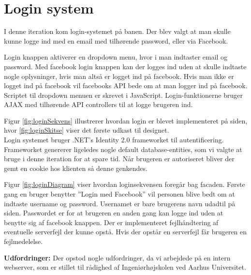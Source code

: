 \section{Login system}

I denne iteration kom login-systemet på banen. Der blev valgt at man skulle kunne logge ind med en email med tilhørende password, eller via Facebook.


Login knappen aktiverer en dropdown menu, hvor i man indtaster email og password. Med facebook login knappen kan der logges ind uden at skulle indtaste nogle oplysninger, hvis man altså er logget ind på facebook. Hvis man ikke er logget ind på facebook vil facebooks API bede om at man logger ind på facebook. Scriptet til dropdown menuen er skrevet i JavaScript. Login-funktionerne bruger AJAX med tilhørende API controllers til at logge brugeren ind.


Figur \ref{fig:loginSekvens} illustrerer hvordan login er blevet implementeret på siden, hvor \ref{fig:loginSkitse} viser det første udkast til designet. \\

Login systemet bruger .NET's Identity 2.0 frameworket til autentificering. Frameworket genererer ligeledes nogle default database-entities, som vi valgte at bruge i denne iteration for at spare tid. Når brugeren er autoriseret bliver der gemt en cookie hos klienten så denne genkendes.



Figur \ref{fig:loginDiagram} viser hvordan loginsekvensen foregår bag facaden. Første gang en bruger benytter ''Login med Facebook'' vil personen blive bedt om at indtaste username og password. Usernamet er bare brugerens navn udadtil på siden. Passwordet er for at brugeren en anden gang kan logge ind uden at benytte sig af facebook knappen. Der er implementeret fejlhåndtering af eventuelle serverfejl der kunne opstå. Hvis der opstår en serverfejl får brugeren en fejlmedelelse.

\textbf{Udfordringer:} 
Der opstod nogle udfordringer, da vi arbejdede på en intern webserver, som er stillet til rådighed af Ingeniørhøjskolen ved Aarhus Universitet. 

